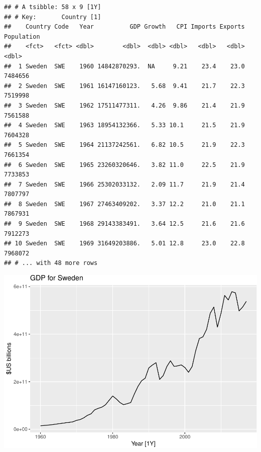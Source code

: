 \documentclass[
]{book}
\newenvironment{Shaded}{\begin{snugshade}}{\end{snugshade}}
\newcommand{\FunctionTok}[1]{\textcolor[rgb]{0.00,0.00,0.00}{#1}}
\newcommand{\NormalTok}[1]{#1}
\newcommand{\SpecialCharTok}[1]{\textcolor[rgb]{0.00,0.00,0.00}{#1}}
\newcommand{\StringTok}[1]{\textcolor[rgb]{0.31,0.60,0.02}{#1}}
\begin{document}
\begin{verbatim}
## # A tsibble: 58 x 9 [1Y]
## # Key:       Country [1]
##    Country Code   Year          GDP Growth   CPI Imports Exports Population
##    <fct>   <fct> <dbl>        <dbl>  <dbl> <dbl>   <dbl>   <dbl>      <dbl>
##  1 Sweden  SWE    1960 14842870293.  NA     9.21    23.4    23.0    7484656
##  2 Sweden  SWE    1961 16147160123.   5.68  9.41    21.7    22.3    7519998
##  3 Sweden  SWE    1962 17511477311.   4.26  9.86    21.4    21.9    7561588
##  4 Sweden  SWE    1963 18954132366.   5.33 10.1     21.5    21.9    7604328
##  5 Sweden  SWE    1964 21137242561.   6.82 10.5     21.9    22.3    7661354
##  6 Sweden  SWE    1965 23260320646.   3.82 11.0     22.5    21.9    7733853
##  7 Sweden  SWE    1966 25302033132.   2.09 11.7     21.9    21.4    7807797
##  8 Sweden  SWE    1967 27463409202.   3.37 12.2     21.0    21.1    7867931
##  9 Sweden  SWE    1968 29143383491.   3.64 12.5     21.6    21.6    7912273
## 10 Sweden  SWE    1969 31649203886.   5.01 12.8     23.0    22.8    7968072
## # ... with 48 more rows
\end{verbatim}

\begin{Shaded}
\end{Shaded}

\includegraphics{graphics/unnamed-chunk-25-1.pdf}
\end{document}
